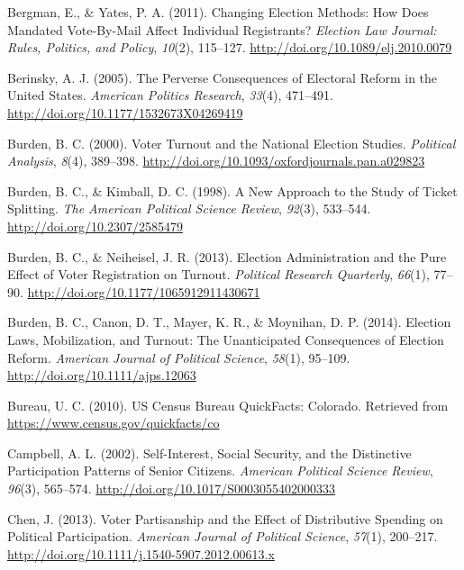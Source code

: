 \documentclass[12pt,twoside]{reedthesis}
\begin{document}
  \hypertarget{ref-bergman_changing_2011}{}
  Bergman, E., \& Yates, P. A. (2011). Changing Election Methods: How Does
  Mandated Vote-By-Mail Affect Individual Registrants? \emph{Election Law
  Journal: Rules, Politics, and Policy}, \emph{10}(2), 115--127.
  \url{http://doi.org/10.1089/elj.2010.0079}
  
  \hypertarget{ref-berinsky_perverse_2005}{}
  Berinsky, A. J. (2005). The Perverse Consequences of Electoral Reform in
  the United States. \emph{American Politics Research}, \emph{33}(4),
  471--491. \url{http://doi.org/10.1177/1532673X04269419}
  
  \hypertarget{ref-burden_voter_2000}{}
  Burden, B. C. (2000). Voter Turnout and the National Election Studies.
  \emph{Political Analysis}, \emph{8}(4), 389--398.
  \url{http://doi.org/10.1093/oxfordjournals.pan.a029823}
  
  \hypertarget{ref-burden_new_1998}{}
  Burden, B. C., \& Kimball, D. C. (1998). A New Approach to the Study of
  Ticket Splitting. \emph{The American Political Science Review},
  \emph{92}(3), 533--544. \url{http://doi.org/10.2307/2585479}
  
  \hypertarget{ref-burden_election_2013}{}
  Burden, B. C., \& Neiheisel, J. R. (2013). Election Administration and
  the Pure Effect of Voter Registration on Turnout. \emph{Political
  Research Quarterly}, \emph{66}(1), 77--90.
  \url{http://doi.org/10.1177/1065912911430671}
  
  \hypertarget{ref-burden_election_2014}{}
  Burden, B. C., Canon, D. T., Mayer, K. R., \& Moynihan, D. P. (2014).
  Election Laws, Mobilization, and Turnout: The Unanticipated Consequences
  of Election Reform. \emph{American Journal of Political Science},
  \emph{58}(1), 95--109. \url{http://doi.org/10.1111/ajps.12063}
  
  \hypertarget{ref-us_census_bureau_us_2010}{}
  Bureau, U. C. (2010). US Census Bureau QuickFacts: Colorado. Retrieved
  from \url{https://www.census.gov/quickfacts/co}
  
  \hypertarget{ref-campbell_self-interest_2002}{}
  Campbell, A. L. (2002). Self-Interest, Social Security, and the
  Distinctive Participation Patterns of Senior Citizens. \emph{American
  Political Science Review}, \emph{96}(3), 565--574.
  \url{http://doi.org/10.1017/S0003055402000333}
  
  \hypertarget{ref-chen_voter_2013}{}
  Chen, J. (2013). Voter Partisanship and the Effect of Distributive
  Spending on Political Participation. \emph{American Journal of Political
  Science}, \emph{57}(1), 200--217.
  \url{http://doi.org/10.1111/j.1540-5907.2012.00613.x}
  
\end{document}
